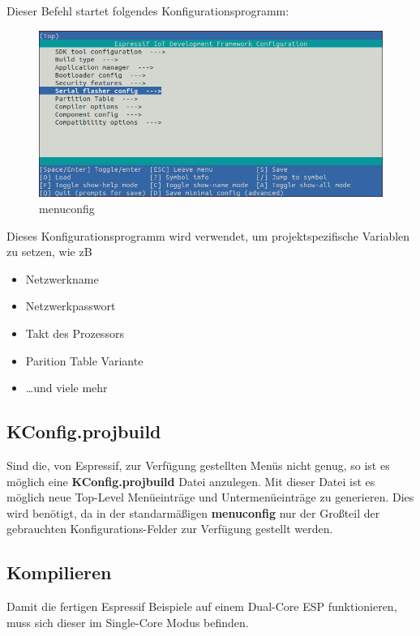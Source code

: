 Dieser Befehl startet folgendes Konfigurationsprogramm:
\begin{figure}[H]
    \begin{center}
        \includegraphics[scale=0.5]{images/menuconfig.png}
        \caption{menuconfig \cite{menuconfig_picture}}
    \end{center}
\end{figure}
Dieses Konfigurationsprogramm wird verwendet, um projektspezifische Variablen zu setzen, wie zB
\begin{itemize}
    \item Netzwerkname
    \item Netzwerkpasswort
    \item Takt des Prozessors
    \item Parition Table Variante
    \item \dots und viele mehr
\end{itemize}


\subsection{KConfig.projbuild}\label{sec:esp-idf-projbuild}
Sind die, von Espressif, zur Verfügung gestellten Menüs nicht genug, so ist es möglich eine \textbf{KConfig.projbuild} Datei anzulegen. Mit dieser Datei ist es möglich neue Top-Level Menüeinträge und Untermenüeinträge zu generieren. Dies wird benötigt, da in der standarmäßigen \textbf{menuconfig} nur der Großteil der gebrauchten Konfigurations-Felder zur Verfügung gestellt werden.

\subsection{Kompilieren}
Damit die fertigen Espressif Beispiele auf einem Dual-Core ESP funktionieren, muss sich dieser im Single-Core Modus befinden.

